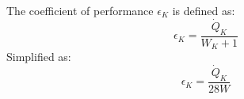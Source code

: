 The coefficient of performance \( \epsilon_K \) is defined as:  
\[
\epsilon_K = \frac{\dot{Q}_K}{W_K + 1}
\]  
Simplified as:  
\[
\epsilon_K = \frac{\dot{Q}_K}{28W}
\]